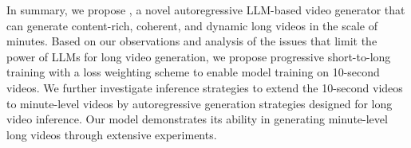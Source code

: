 In summary, we propose \ours, a novel autoregressive LLM-based video generator that can generate content-rich, coherent, and dynamic long videos in the scale of minutes. Based on our observations and analysis of the issues that limit the power of LLMs for long video generation, we propose progressive short-to-long training with a loss weighting scheme to enable model training on 10-second videos. We further investigate inference strategies to extend the 10-second videos to minute-level videos by autoregressive generation strategies designed for long video inference. Our model demonstrates its ability in generating minute-level long videos through extensive experiments.

